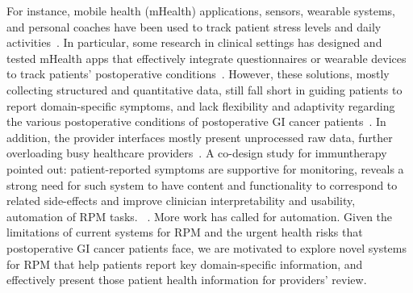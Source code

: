 For instance, mobile health (mHealth) applications, sensors, wearable systems, and personal coaches have been used to track patient stress levels and daily activities~\cite{goncalves-bradley_mobile_2020,segoviaSmartphonebasedEcologicalMomentary2020, kingMicroStressEMAPassive2019, jacobsMyPathInvestigatingBreast2018}. 
In particular, some research in clinical settings has designed and tested mHealth apps that effectively integrate questionnaires or wearable devices to track patients' postoperative conditions~\cite{sempleUsingMobileApp2015}.
However, these solutions, mostly collecting structured and quantitative data, still fall short in guiding patients to report domain-specific symptoms, and lack flexibility and adaptivity regarding the various postoperative conditions of postoperative GI cancer patients~\cite{yangWishThereWere2024}. In addition, the provider interfaces mostly present unprocessed raw data, further overloading busy healthcare providers~\cite{yangWishThereWere2024, sempleUsingMobileApp2015}. A co-design study for immuntherapy pointed out: patient-reported symptoms are supportive for monitoring, reveals a strong need for such system to have content and functionality to correspond to related side-effects and improve clinician interpretability and usability, automation of RPM tasks. ~\cite{lai2024co}. More work has called for automation.
Given the limitations of current systems for RPM and the urgent health risks that postoperative GI cancer patients face, we are motivated to explore novel systems for RPM that help patients report key domain-specific information, and effectively present those patient health information for providers' review.

